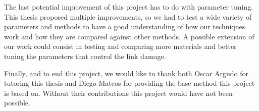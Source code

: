 The last potential improvement of this project has to do with parameter tuning. 
This thesis proposed multiple improvements, so we had to test a wide 
variety of parameters and methods to have a good understanding of how 
our techniques work and how they are compared against other methods. A 
possible extension of our work could consist in testing and comparing 
more materials and better tuning the parameters that control the link 
damage.  

\vspace{10pt}

Finally, and to end this project, we would like to thank both 
Oscar Argudo for tutoring this thesis and Diego Mateos for 
providing the base method this project is based on. Without their 
contributions this project would have not been possible.